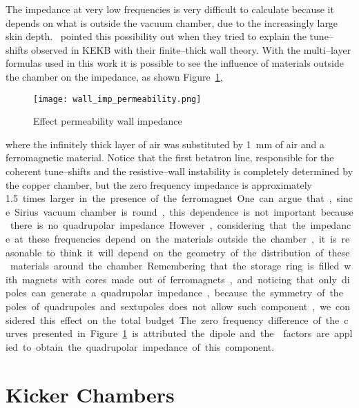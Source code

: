     The impedance at very low frequencies is very difficult to calculate because it depends on what is outside the vacuum chamber, due to the increasingly large skin depth.~ pointed this possibility out when they tried to explain the tune--shifts observed in KEKB with their finite--thick wall theory. With the multi--layer formulas used in this work it is possible to see the influence of materials outside the chamber on the impedance, as shown Figure~\ref{fig:wall_dipole_permeability},
    \begin{figure}
        \centering
        \texttt{[image: wall\_imp\_permeability.png]}
        \caption{Effect permeability wall impedance}
        \label{fig:wall_dipole_permeability}
    \end{figure}
    where the infinitely thick layer of air was substituted by \SI{1}{\milli\meter} of air and a ferromagnetic material. Notice that the first betatron line, responsible for the coherent tune--shifts and the resistive--wall instability is completely determined by the copper chamber, but the zero frequency impedance is approximately \SI{1.5} times larger in the presence of the ferromagnet. One can argue that, since Sirius vacuum chamber is round, this dependence is not important because there is no quadrupolar impedance. However, considering that the impedance at these frequencies depend on the materials outside the chamber, it is reasonable to think it will depend on the geometry of the distribution of these materials around the chamber. Remembering that the storage ring is filled with magnets with cores made out of ferromagnets, and noticing that only dipoles can generate a quadrupolar impedance, because the symmetry of the poles of quadrupoles and sextupoles does not allow such component, we considered this effect on the total budget. The zero frequency difference of the curves presented in Figure~\ref{fig:wall_dipole_permeability} is attributed the dipole and the  factors are applied to obtain the quadrupolar impedance of this component.

\section{Kicker Chambers}

